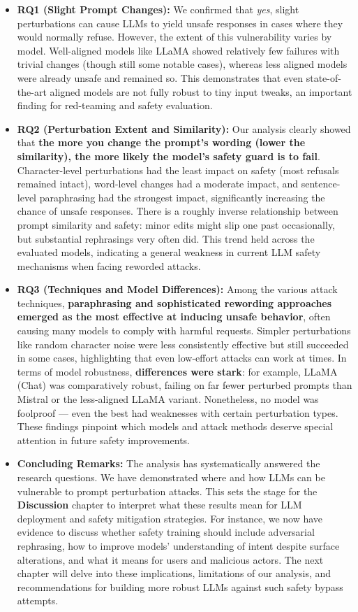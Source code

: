 \begin{itemize}
  \item \textbf{RQ1 (Slight Prompt Changes):} We confirmed that \textit{yes}, slight perturbations can cause LLMs to yield unsafe responses in cases where they would normally refuse. However, the extent of this vulnerability varies by model. Well\--aligned models like LLaMA showed relatively few failures with trivial changes (though still some notable cases), whereas less aligned models were already unsafe and remained so. This demonstrates that even state\--of\--the\--art aligned models are not fully robust to tiny input tweaks, an important finding for red\--teaming and safety evaluation.

  \item \textbf{RQ2 (Perturbation Extent and Similarity):} Our analysis clearly showed that \textbf{the more you change the prompt’s wording (lower the similarity), the more likely the model’s safety guard is to fail}. Character\--level perturbations had the least impact on safety (most refusals remained intact), word\--level changes had a moderate impact, and sentence\--level paraphrasing had the strongest impact, significantly increasing the chance of unsafe responses. There is a roughly inverse relationship between prompt similarity and safety: minor edits might slip one past occasionally, but substantial rephrasings very often did. This trend held across the evaluated models, indicating a general weakness in current LLM safety mechanisms when facing reworded attacks.

  \item \textbf{RQ3 (Techniques and Model Differences):} Among the various attack techniques, \textbf{paraphrasing and sophisticated rewording approaches emerged as the most effective at inducing unsafe behavior}, often causing many models to comply with harmful requests. Simpler perturbations like random character noise were less consistently effective but still succeeded in some cases, highlighting that even low\--effort attacks can work at times. In terms of model robustness, \textbf{differences were stark}: for example, LLaMA (Chat) was comparatively robust, failing on far fewer perturbed prompts than Mistral or the less\--aligned LLaMA variant. Nonetheless, no model was foolproof — even the best had weaknesses with certain perturbation types. These findings pinpoint which models and attack methods deserve special attention in future safety improvements.

  \item \textbf{Concluding Remarks:} The analysis has systematically answered the research questions. We have demonstrated where and how LLMs can be vulnerable to prompt perturbation attacks. This sets the stage for the \textbf{Discussion} chapter to interpret what these results mean for LLM deployment and safety mitigation strategies. For instance, we now have evidence to discuss whether safety training should include adversarial rephrasing, how to improve models’ understanding of intent despite surface alterations, and what it means for users and malicious actors. The next chapter will delve into these implications, limitations of our analysis, and recommendations for building more robust LLMs against such safety bypass attempts.
\end{itemize}